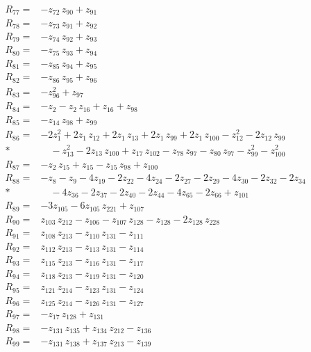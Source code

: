 \documentclass[11pt]{article}
\theoremstyle{remark}\newtheorem{remark}[theorem]{Remark}
\begin{document}
\begin{align*}
R_{77}={}& -z_{72}\,z_{90} + z_{91} \\[2pt]
R_{78}={}& -z_{73}\,z_{91} + z_{92} \\[2pt]
R_{79}={}& -z_{74}\,z_{92} + z_{93} \\[2pt]
R_{80}={}& -z_{75}\,z_{93} + z_{94} \\[2pt]
R_{81}={}& -z_{85}\,z_{94} + z_{95} \\[2pt]
R_{82}={}& -z_{86}\,z_{95} + z_{96} \\[2pt]
R_{83}={}& -z_{96}^{2} + z_{97} \\[2pt]
R_{84}={}& -z_{2} - z_{2}\,z_{16} + z_{16} + z_{98} \\[2pt]
R_{85}={}& -z_{14}\,z_{98} + z_{99} \\[2pt]
R_{86}={}& -2z_{1}^{2} + 2z_{1}\,z_{12} + 2z_{1}\,z_{13} + 2z_{1}\,z_{99} + 2z_{1}\,z_{100} - z_{12}^{2} - 2z_{12}\,z_{99} \\*
&\quad  - z_{13}^{2} - 2z_{13}\,z_{100} + z_{17}\,z_{102} - z_{78}\,z_{97} - z_{80}\,z_{97} - z_{99}^{2} - z_{100}^{2} \\[2pt]
R_{87}={}& -z_{2}\,z_{15} + z_{15} - z_{15}\,z_{98} + z_{100} \\[2pt]
R_{88}={}& -z_{8} - z_{9} - 4z_{19} - 2z_{22} - 4z_{24} - 2z_{27} - 2z_{29} - 4z_{30} - 2z_{32} - 2z_{34} \\*
&\quad  - 4z_{36} - 2z_{37} - 2z_{40} - 2z_{44} - 4z_{65} - 2z_{66} + z_{101} \\[2pt]
R_{89}={}& -3z_{105} - 6z_{105}\,z_{221} + z_{107} \\[2pt]
R_{90}={}& z_{103}\,z_{212} - z_{106} - z_{107}\,z_{128} - z_{128} - 2z_{128}\,z_{228} \\[2pt]
R_{91}={}& z_{108}\,z_{213} - z_{110}\,z_{131} - z_{111} \\[2pt]
R_{92}={}& z_{112}\,z_{213} - z_{113}\,z_{131} - z_{114} \\[2pt]
R_{93}={}& z_{115}\,z_{213} - z_{116}\,z_{131} - z_{117} \\[2pt]
R_{94}={}& z_{118}\,z_{213} - z_{119}\,z_{131} - z_{120} \\[2pt]
R_{95}={}& z_{121}\,z_{214} - z_{123}\,z_{131} - z_{124} \\[2pt]
R_{96}={}& z_{125}\,z_{214} - z_{126}\,z_{131} - z_{127} \\[2pt]
R_{97}={}& -z_{17}\,z_{128} + z_{131} \\[2pt]
R_{98}={}& -z_{131}\,z_{135} + z_{134}\,z_{212} - z_{136} \\[2pt]
R_{99}={}& -z_{131}\,z_{138} + z_{137}\,z_{213} - z_{139} \\[2pt]

\end{align*}
\end{document}

